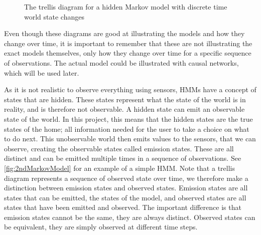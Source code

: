 \begin{figure}[htbp]
\centering
{}
\caption[Trellis diagram for a simple Markov model]{The trellis diagram for a hidden Markov model with discrete time world state changes}\label{fig:1stMarkovModel}
\end{figure}

Even though these diagrams are good at illustrating the models and how they change over time, it is important to remember that these are not illustrating the exact models themselves, only how they change over time for a specific sequence of observations. The actual model could be illustrated with causal networks, which will be used later.

As it is not realistic to observe everything using sensors, HMMs have a concept of states that are hidden. These states represent what the state of the world is in reality, and is therefore not observable. A hidden state can emit an observable state of the world. In this project, this means that the hidden states are the true states of the home; all information needed for the user to take a choice on what to do next. This unobservable world then emits values to the sensors, that we can observe, creating the observable states called emission states. These are all distinct and can be emitted multiple times in a sequence of observations. See \cref{fig:2ndMarkovModel} for an example of a simple HMM. Note that a trellis diagram represents a sequence of observed state over time, we therefore make a distinction between emission states and observed states. Emission states are all states that can be emitted, the states of the model, and observed states are all states that have been emitted and observed. The important difference is that emission states cannot be the same, they are always distinct. Observed states can be equivalent, they are simply observed at different time steps.


